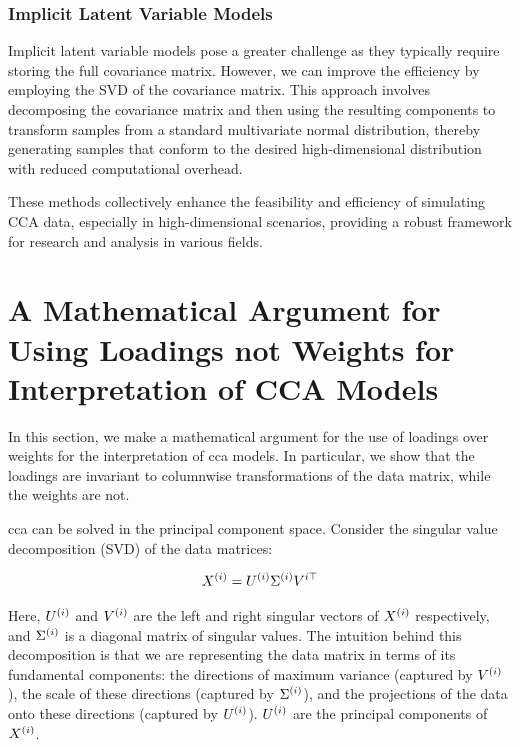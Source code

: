\subsubsection{Implicit Latent Variable Models}
Implicit latent variable models pose a greater challenge as they typically require storing the full covariance matrix.
However, we can improve the efficiency by employing the SVD of the covariance matrix.
This approach involves decomposing the covariance matrix and then using the resulting components to transform samples from a standard multivariate normal distribution, thereby generating samples that conform to the desired high-dimensional distribution with reduced computational overhead.

These methods collectively enhance the feasibility and efficiency of simulating CCA data, especially in high-dimensional scenarios, providing a robust framework for research and analysis in various fields.

\section{A Mathematical Argument for Using Loadings not Weights for Interpretation of CCA Models}\label{sec:an-argument-for-the-use-of-loadings}

In this section, we make a mathematical argument for the use of \gls{loadings} over weights for the interpretation of \acrshort{cca} models.
In particular, we show that the \gls{loadings} are invariant to columnwise transformations of the data matrix, while the weights are not.

\acrshort{cca} can be solved in the principal component space.
Consider the singular value decomposition (SVD) of the data matrices:

\begin{align}
    X^{(i)} = U^{(i)}\Sigma^{(i)}V^{i\top} \label{eq:svd}
\end{align}

Here, $U^{(i)}$ and $V^{(i)}$ are the left and right singular vectors of $X^{(i)}$ respectively, and $\Sigma^{(i)}$ is a diagonal matrix of singular values.
The intuition behind this decomposition is that we are representing the data matrix in terms of its fundamental components: the directions of maximum variance (captured by $V^{(i)}$), the scale of these directions (captured by $\Sigma^{(i)}$), and the projections of the data onto these directions (captured by $U^{(i)}$).
$U^{(i)}$ are the principal components of $X^{(i)}$.

